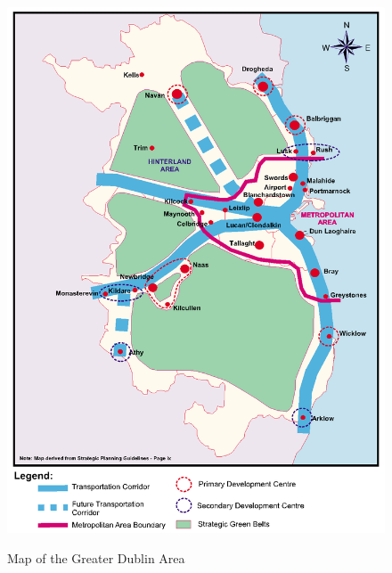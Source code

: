 \begin{figure}[htbp]
    \center \includegraphics[width=400pt]{./image/intro1}\\
    \caption{Map of the Greater Dublin Area \citep{PLA01}} \label{Figure: Map of the Greater Dublin
        Area}
\end{figure}

\newpage

